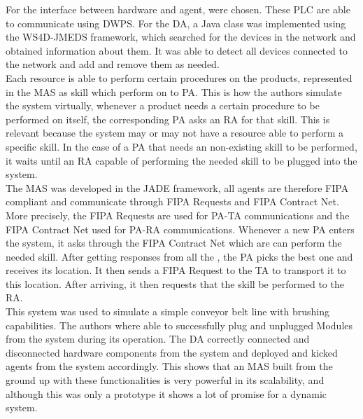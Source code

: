 For the interface between hardware and agent,  were chosen. These \acrshort{PLC} are able to communicate using \acrfull{DWPS}. For the \acrshort{DA}, a Java class was implemented using the \acrfull{WS4D-JMEDS} framework, which searched for the devices in the network and obtained information about them. It was able to detect all devices connected to the network and add and remove them as needed.\\

Each resource is able to perform certain procedures on the products, represented in the \acrshort{MAS} as skill which  perform on to \acrshort{PA}. This is how the authors simulate the system virtually, whenever a product needs a certain procedure to be performed on itself, the corresponding \acrshort{PA} asks an \acrshort{RA} for that skill. This is relevant because the system may or may not have a resource able to perform a specific skill. In the case of a \acrshort{PA} that needs an non-existing skill to be performed, it waits until an \acrshort{RA} capable of performing the needed skill to be plugged into the system.\\

The \acrshort{MAS} was developed in the \acrshort{JADE} framework, all agents are therefore \acrshort{FIPA} compliant and communicate through \acrshort{FIPA} Requests and \acrshort{FIPA} Contract Net. More precisely, the \acrshort{FIPA} Requests are used for \acrshort{PA}-\acrshort{TA} communications and the \acrshort{FIPA} Contract Net used for \acrshort{PA}-\acrshort{RA} communications. Whenever a new \acrshort{PA} enters the system, it asks through the \acrshort{FIPA} Contract Net which  are can perform the needed skill. After getting responses from all the , the \acrshort{PA} picks the best one and receives its location. It then sends a \acrshort{FIPA} Request to the \acrshort{TA} to transport it to this location. After arriving, it then requests that the skill be performed to the \acrshort{RA}.\\

This system was used to simulate a simple conveyor belt line with brushing capabilities. The authors where able to successfully plug and unplugged Modules from the system during its operation. The \acrshort{DA} correctly connected and disconnected hardware components from the system and deployed and kicked agents from the system accordingly. This shows that an \acrshort{MAS} built from the ground up with these functionalities is very powerful in its scalability, and although this was only a prototype it shows a lot of promise for a dynamic system.

